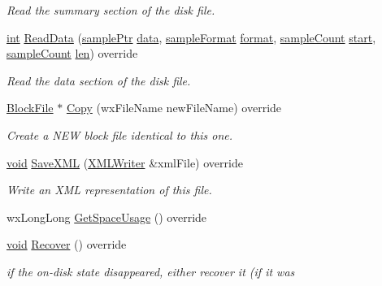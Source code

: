 \begin{DoxyCompactItemize}
\begin{DoxyCompactList}\small\item\em Read the summary section of the disk file. \end{DoxyCompactList}\item 
\hyperlink{xmltok_8h_a5a0d4a5641ce434f1d23533f2b2e6653}{int} \hyperlink{class_simple_block_file_aa47fae91065e62427058eca80c9e3db0}{Read\+Data} (\hyperlink{include_2audacity_2_types_8h_aaafb46d1caf7c79262fec96b577215fe}{sample\+Ptr} \hyperlink{lib_2expat_8h_ac39e72a1de1cb50dbdc54b08d0432a24}{data}, \hyperlink{include_2audacity_2_types_8h_a9938d2e2f6adef23e745cd80ef379792}{sample\+Format} \hyperlink{_export_p_c_m_8cpp_a317afff57d87a89158c2b038d37b2b08}{format}, \hyperlink{include_2audacity_2_types_8h_afa427e1f521ea5ec12d054e8bd4d0f71}{sample\+Count} \hyperlink{seqread_8c_ac503262ae470564980711da4f78b1181}{start}, \hyperlink{include_2audacity_2_types_8h_afa427e1f521ea5ec12d054e8bd4d0f71}{sample\+Count} \hyperlink{lib_2expat_8h_af86d325fecfc8f47b61fbf5a5146f582}{len}) override
\begin{DoxyCompactList}\small\item\em Read the data section of the disk file. \end{DoxyCompactList}\item 
\hyperlink{class_block_file}{Block\+File} $\ast$ \hyperlink{class_simple_block_file_afb58bbeb0e3c55dea13ba4db37f8acb4}{Copy} (wx\+File\+Name new\+File\+Name) override
\begin{DoxyCompactList}\small\item\em Create a N\+EW block file identical to this one. \end{DoxyCompactList}\item 
\hyperlink{sound_8c_ae35f5844602719cf66324f4de2a658b3}{void} \hyperlink{class_simple_block_file_a7bd4085ca1c7b284cbe79bd2353a0f60}{Save\+X\+ML} (\hyperlink{class_x_m_l_writer}{X\+M\+L\+Writer} \&xml\+File) override
\begin{DoxyCompactList}\small\item\em Write an X\+ML representation of this file. \end{DoxyCompactList}\item 
wx\+Long\+Long \hyperlink{class_simple_block_file_a22780e266548fb57b029706726f01472}{Get\+Space\+Usage} () override
\item 
\hyperlink{sound_8c_ae35f5844602719cf66324f4de2a658b3}{void} \hyperlink{class_simple_block_file_ad0ed207e9d4d21558f14b0e0df7cbb72}{Recover} () override
\begin{DoxyCompactList}\small\item\em if the on-\/disk state disappeared, either recover it (if it was \end{DoxyCompactList}\item 

\end{DoxyCompactItemize}
